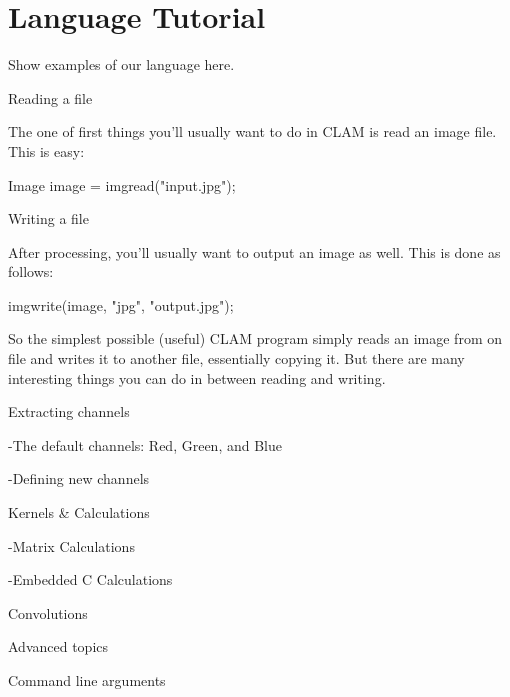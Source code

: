 \chapter{Language Tutorial}

Show examples of our language here.

Reading a file

The one of first things you'll usually want to do in CLAM is read an image file. This is easy:

Image image = imgread("input.jpg");

Writing a file

After processing, you'll usually want to output an image as well. This is done as follows:

imgwrite(image, "jpg", "output.jpg");

So the simplest possible (useful) CLAM program simply reads an image from on file and writes it to another file, essentially copying it. But there are many interesting things you can do in between reading and writing.

Extracting channels

-The default channels: Red, Green, and Blue

-Defining new channels

Kernels & Calculations

-Matrix Calculations

-Embedded C Calculations

Convolutions

Advanced topics

Command line arguments
